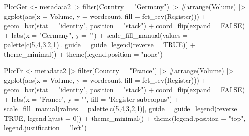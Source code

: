 \documentclass[
  letterpaper,
  DIV=11,
  numbers=noendperiod]{scrreprt}
\newenvironment{Shaded}{\begin{snugshade}}{\end{snugshade}}
\newcommand{\AttributeTok}[1]{\textcolor[rgb]{0.40,0.45,0.13}{#1}}
\newcommand{\CommentTok}[1]{\textcolor[rgb]{0.37,0.37,0.37}{#1}}
\newcommand{\ConstantTok}[1]{\textcolor[rgb]{0.56,0.35,0.01}{#1}}
\newcommand{\DecValTok}[1]{\textcolor[rgb]{0.68,0.00,0.00}{#1}}
\newcommand{\FunctionTok}[1]{\textcolor[rgb]{0.28,0.35,0.67}{#1}}
\newcommand{\NormalTok}[1]{\textcolor[rgb]{0.00,0.23,0.31}{#1}}
\newcommand{\OtherTok}[1]{\textcolor[rgb]{0.00,0.23,0.31}{#1}}
\newcommand{\SpecialCharTok}[1]{\textcolor[rgb]{0.37,0.37,0.37}{#1}}
\newcommand{\StringTok}[1]{\textcolor[rgb]{0.13,0.47,0.30}{#1}}
\begin{document}
\begin{Shaded}
\begin{Highlighting}[]
\NormalTok{PlotGer }\OtherTok{\textless{}{-}}\NormalTok{ metadata2 }\SpecialCharTok{|\textgreater{}}  
  \FunctionTok{filter}\NormalTok{(Country}\SpecialCharTok{==}\StringTok{"Germany"}\NormalTok{) }\SpecialCharTok{|\textgreater{}}  
  \CommentTok{\#arrange(Volume) |\textgreater{}  }
  \FunctionTok{ggplot}\NormalTok{(}\FunctionTok{aes}\NormalTok{(}\AttributeTok{x =}\NormalTok{ Volume, }\AttributeTok{y =}\NormalTok{ wordcount, }\AttributeTok{fill =} \FunctionTok{fct\_rev}\NormalTok{(Register))) }\SpecialCharTok{+} 
    \FunctionTok{geom\_bar}\NormalTok{(}\AttributeTok{stat =} \StringTok{"identity"}\NormalTok{, }\AttributeTok{position =} \StringTok{"stack"}\NormalTok{) }\SpecialCharTok{+}
    \FunctionTok{coord\_flip}\NormalTok{(}\AttributeTok{expand =} \ConstantTok{FALSE}\NormalTok{) }\SpecialCharTok{+}
    \FunctionTok{labs}\NormalTok{(}\AttributeTok{x =} \StringTok{"Germany"}\NormalTok{, }\AttributeTok{y =} \StringTok{""}\NormalTok{) }\SpecialCharTok{+}
    \FunctionTok{scale\_fill\_manual}\NormalTok{(}\AttributeTok{values =}\NormalTok{ palette[}\FunctionTok{c}\NormalTok{(}\DecValTok{5}\NormalTok{,}\DecValTok{4}\NormalTok{,}\DecValTok{3}\NormalTok{,}\DecValTok{2}\NormalTok{,}\DecValTok{1}\NormalTok{)], }\AttributeTok{guide =} \FunctionTok{guide\_legend}\NormalTok{(}\AttributeTok{reverse =} \ConstantTok{TRUE}\NormalTok{)) }\SpecialCharTok{+}
    \FunctionTok{theme\_minimal}\NormalTok{() }\SpecialCharTok{+} \FunctionTok{theme}\NormalTok{(}\AttributeTok{legend.position =} \StringTok{"none"}\NormalTok{)}

\NormalTok{PlotFr }\OtherTok{\textless{}{-}}\NormalTok{ metadata2 }\SpecialCharTok{|\textgreater{}}  
  \FunctionTok{filter}\NormalTok{(Country}\SpecialCharTok{==}\StringTok{"France"}\NormalTok{) }\SpecialCharTok{|\textgreater{}}  
  \CommentTok{\#arrange(Volume) |\textgreater{}  }
  \FunctionTok{ggplot}\NormalTok{(}\FunctionTok{aes}\NormalTok{(}\AttributeTok{x =}\NormalTok{ Volume, }\AttributeTok{y =}\NormalTok{ wordcount, }\AttributeTok{fill =} \FunctionTok{fct\_rev}\NormalTok{(Register))) }\SpecialCharTok{+} 
    \FunctionTok{geom\_bar}\NormalTok{(}\AttributeTok{stat =} \StringTok{"identity"}\NormalTok{, }\AttributeTok{position =} \StringTok{"stack"}\NormalTok{) }\SpecialCharTok{+}
    \FunctionTok{coord\_flip}\NormalTok{(}\AttributeTok{expand =} \ConstantTok{FALSE}\NormalTok{) }\SpecialCharTok{+}
    \FunctionTok{labs}\NormalTok{(}\AttributeTok{x =} \StringTok{"France"}\NormalTok{, }\AttributeTok{y  =} \StringTok{""}\NormalTok{, }\AttributeTok{fill =} \StringTok{"Register subcorpus"}\NormalTok{) }\SpecialCharTok{+}
    \FunctionTok{scale\_fill\_manual}\NormalTok{(}\AttributeTok{values =}\NormalTok{ palette[}\FunctionTok{c}\NormalTok{(}\DecValTok{5}\NormalTok{,}\DecValTok{4}\NormalTok{,}\DecValTok{3}\NormalTok{,}\DecValTok{2}\NormalTok{,}\DecValTok{1}\NormalTok{)], }\AttributeTok{guide =} \FunctionTok{guide\_legend}\NormalTok{(}\AttributeTok{reverse =} \ConstantTok{TRUE}\NormalTok{, }\AttributeTok{legend.hjust =} \DecValTok{0}\NormalTok{)) }\SpecialCharTok{+}
    \FunctionTok{theme\_minimal}\NormalTok{() }\SpecialCharTok{+} \FunctionTok{theme}\NormalTok{(}\AttributeTok{legend.position =} \StringTok{"top"}\NormalTok{, }\AttributeTok{legend.justification =} \StringTok{"left"}\NormalTok{)}


\end{Highlighting}
\end{Shaded}
\end{document}

